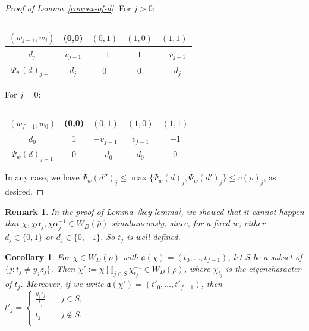 \documentclass{article}
\newtheorem{corollary}[definition]{Corollary}
\newtheorem{remark}[definition]{Remark}
\numberwithin{equation}{section}
\newcommand{\fa}{\mathfrak{a}}
\begin{document}
\begin{proof}[Proof of Lemma~\ref{convex-of-d}]
    For $j>0$:
    \begin{table}[H]
        \centering
        \caption{}
        \label{table3}
        \begin{tabular}{|c|c|c|c|c|}
            \hline
           $(w_{j-1}, w_j)$ &(0,0) & $(0,1)$ & $(1,0)$ & $(1,1)$ \\ \hline
            
           $d_j$ & $v_{j-1}$ & $-1$ & $1$ & $-v_{j-1}$\\ \hline
            
            $\Psi_{w}(d)_{j-1}$ & $d_j$ & $0$&$0$&$-d_j$\\ \hline
        \end{tabular}
    \end{table}

For $j=0$:
\begin{table}[H]
    \centering
    \caption{}
    \label{table4}
    \begin{tabular}{|c|c|c|c|c|}
        \hline
       $(w_{f-1}, w_0)$ &(0,0) & $(0,1)$ & $(1,0)$ & $(1,1)$ \\ \hline
        
       $d_0$ & $1$ & $-v_{f-1}$ & $v_{f-1}$ & $-1$ \\ \hline
        
        $\Psi_{w}(d)_{f-1}$ & $0$ &$-d_0$& $d_0$&$0$\\ \hline
    \end{tabular}
\end{table}

In any case, we have $\Psi_w(d'')_{j}\leq\max\{\Psi_w(d)_{j}, \Psi_w(d')_j\}\leq v(\bar{\rho})_j$, as desired. 
\end{proof}


\begin{remark}\label{t_j-well-defined}
    In the proof of Lemma~\ref{key-lemma}, we showed that it cannot happen that $\chi,\chi\alpha_j,\chi\alpha_j^{-1}\in W_D(\bar{\rho})$ simultaneously, 
    since, for a fixed $w$, either $d_j\in\{0,1\}$ or $d_j\in\{0,-1\}$. 
    So $t_j$ is well-defined.
\end{remark}

\begin{corollary}\label{key-lemma-inverse}
    For $\chi\in W_D(\bar{\rho})$ with $\fa(\chi)=(t_0,\ldots,t_{f-1})$, 
    let $S$ be a subset of $\{j:t_j\ne y_jz_j\}$. 
    Then $\chi':=\chi\prod_{j\in S}\chi_{t_j}^{-1}\in W_{D}(\bar{\rho})$, where $\chi_{t_j}$ is the eigencharacter of $t_j$. 
    Moreover, if we write $\fa(\chi')=(t'_0,\ldots,t'_{f-1})$, then $t'_j=\begin{cases}
        \frac{y_jz_j}{t_j}\quad &j\in S,\\
        t_j\quad &j\notin S.\\
    \end{cases}$
\end{corollary}
\end{document}

